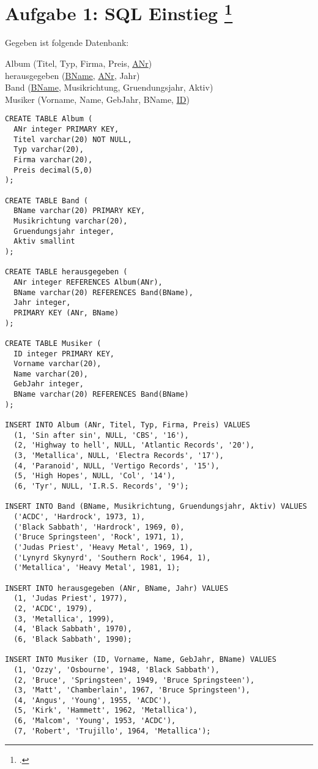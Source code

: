 \documentclass{lehramt-informatik-aufgabe}
\begin{document}

\section{Aufgabe 1: SQL Einstieg
\footcite{db:pu:2}}

Gegeben ist folgende Datenbank: \bigskip

{
\ttfamily
\noindent
Album (Titel, Typ, Firma, Preis, \underline{ANr})\\
\noindent
herausgegeben (\underline{BName}, \underline{ANr}, Jahr)\\
\noindent
Band (\underline{BName}, Musikrichtung, Gruendungsjahr, Aktiv)\\
\noindent
Musiker (Vorname, Name, GebJahr, BName, \underline{ID})\\
}

\begin{verbatim}
CREATE TABLE Album (
  ANr integer PRIMARY KEY,
  Titel varchar(20) NOT NULL,
  Typ varchar(20),
  Firma varchar(20),
  Preis decimal(5,0)
);

CREATE TABLE Band (
  BName varchar(20) PRIMARY KEY,
  Musikrichtung varchar(20),
  Gruendungsjahr integer,
  Aktiv smallint
);

CREATE TABLE herausgegeben (
  ANr integer REFERENCES Album(ANr),
  BName varchar(20) REFERENCES Band(BName),
  Jahr integer,
  PRIMARY KEY (ANr, BName)
);

CREATE TABLE Musiker (
  ID integer PRIMARY KEY,
  Vorname varchar(20),
  Name varchar(20),
  GebJahr integer,
  BName varchar(20) REFERENCES Band(BName)
);

INSERT INTO Album (ANr, Titel, Typ, Firma, Preis) VALUES
  (1, 'Sin after sin', NULL, 'CBS', '16'),
  (2, 'Highway to hell', NULL, 'Atlantic Records', '20'),
  (3, 'Metallica', NULL, 'Electra Records', '17'),
  (4, 'Paranoid', NULL, 'Vertigo Records', '15'),
  (5, 'High Hopes', NULL, 'Col', '14'),
  (6, 'Tyr', NULL, 'I.R.S. Records', '9');

INSERT INTO Band (BName, Musikrichtung, Gruendungsjahr, Aktiv) VALUES
  ('ACDC', 'Hardrock', 1973, 1),
  ('Black Sabbath', 'Hardrock', 1969, 0),
  ('Bruce Springsteen', 'Rock', 1971, 1),
  ('Judas Priest', 'Heavy Metal', 1969, 1),
  ('Lynyrd Skynyrd', 'Southern Rock', 1964, 1),
  ('Metallica', 'Heavy Metal', 1981, 1);

INSERT INTO herausgegeben (ANr, BName, Jahr) VALUES
  (1, 'Judas Priest', 1977),
  (2, 'ACDC', 1979),
  (3, 'Metallica', 1999),
  (4, 'Black Sabbath', 1970),
  (6, 'Black Sabbath', 1990);

INSERT INTO Musiker (ID, Vorname, Name, GebJahr, BName) VALUES
  (1, 'Ozzy', 'Osbourne', 1948, 'Black Sabbath'),
  (2, 'Bruce', 'Springsteen', 1949, 'Bruce Springsteen'),
  (3, 'Matt', 'Chamberlain', 1967, 'Bruce Springsteen'),
  (4, 'Angus', 'Young', 1955, 'ACDC'),
  (5, 'Kirk', 'Hammett', 1962, 'Metallica'),
  (6, 'Malcom', 'Young', 1953, 'ACDC'),
  (7, 'Robert', 'Trujillo', 1964, 'Metallica');
\end{verbatim}
\end{document}
